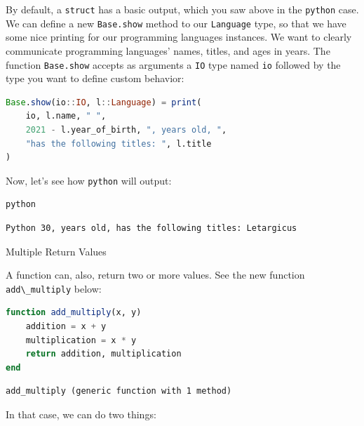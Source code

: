 \documentclass[
  notoc %
]{tufte-book}
\makeatletter
\newcommand{\passthrough}[1]{#1}
\renewcommand\subsubsection{%
\@startsection{subsubsection}{3}{\z@ }{-3.25ex\@plus -1ex \@minus -.2ex}{1.5ex \@plus .2ex}{\normalfont \normalsize \bfseries }
}
\makeatother
\begin{document}
By default, a \passthrough{\lstinline!struct!} has a basic output, which
you saw above in the \passthrough{\lstinline!python!} case. We can
define a new \passthrough{\lstinline!Base.show!} method to our
\passthrough{\lstinline!Language!} type, so that we have some nice
printing for our programming languages instances. We want to clearly
communicate programming languages' names, titles, and ages in years. The
function \passthrough{\lstinline!Base.show!} accepts as arguments a
\passthrough{\lstinline!IO!} type named \passthrough{\lstinline!io!}
followed by the type you want to define custom behavior:

\begin{lstlisting}[language=Julia]
Base.show(io::IO, l::Language) = print(
    io, l.name, " ",
    2021 - l.year_of_birth, ", years old, ",
    "has the following titles: ", l.title
)
\end{lstlisting}

Now, let's see how \passthrough{\lstinline!python!} will output:

\begin{lstlisting}[language=Julia]
python
\end{lstlisting}

\begin{lstlisting}[language=Output]
Python 30, years old, has the following titles: Letargicus
\end{lstlisting}

\hypertarget{sec:function_multiple}{%
\subsubsection{Multiple Return Values}\label{sec:function_multiple}}

A function can, also, return two or more values. See the new function
\passthrough{\lstinline!add\_multiply!} below:

\begin{lstlisting}[language=Julia]
function add_multiply(x, y)
    addition = x + y
    multiplication = x * y
    return addition, multiplication
end
\end{lstlisting}

\begin{lstlisting}[language=Output]
add_multiply (generic function with 1 method)
\end{lstlisting}

In that case, we can do two things:
\end{document}
